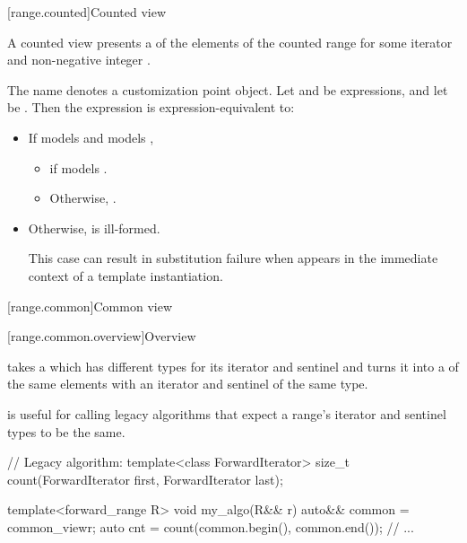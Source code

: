 \documentclass{wg21}
\begin{document}
[range.counted]{Counted view}

\pnum
A counted view presents a  of the elements
of the counted range 
for some iterator  and non-negative integer .

\pnum
The name  denotes a
customization point object.
Let  and  be expressions,
and let  be .
Then the expression  is expression-equivalent to:

\begin{itemize}
\item If  models  and
 models ,
\begin{itemize}
	\item {}
	if  models .
	\item Otherwise,
	.
\end{itemize}

\item Otherwise,  is ill-formed.
\begin{note}
	This case can result in substitution failure when 
	appears in the immediate context of a template instantiation.
\end{note}
\end{itemize}

[range.common]{Common view}

[range.common.overview]{Overview}

\pnum
{} takes a  which has different types for
its iterator and sentinel and turns it into a  of the same
elements with an iterator and sentinel of the same type.

\pnum
\begin{note}
 is useful for calling legacy algorithms that expect
a range's iterator and sentinel types to be the same.
\end{note}

\pnum
\begin{example}
\begin{codeblock}
	// Legacy algorithm:
	template<class ForwardIterator>
	size_t count(ForwardIterator first, ForwardIterator last);

	template<forward_range R>
	void my_algo(R&& r) {
		auto&& common = common_view{r};
		auto cnt = count(common.begin(), common.end());
		// ...
	}
\end{codeblock}
\end{example}
\end{document}
